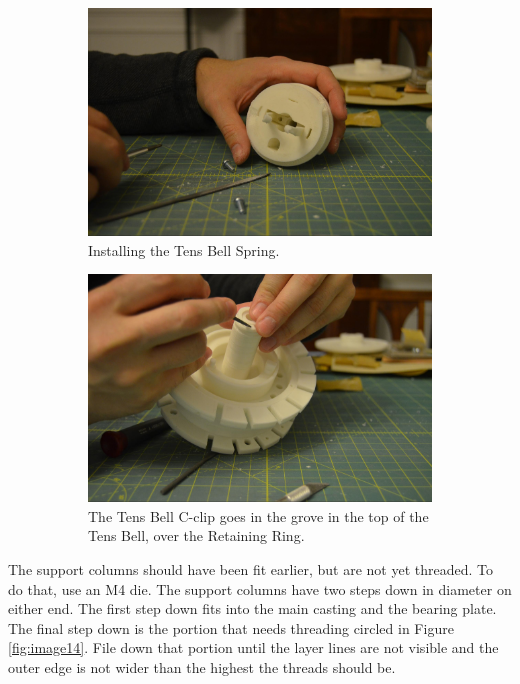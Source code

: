 \documentclass[openany]{book}
\begin{document}
\begin{figure}[!ht]
	\centering
	\begin{subfigure}{.4\textwidth}
		\centering
		\includegraphics[width=.95\textwidth]{images/image4.jpg}
		\caption{Installing the Tens Bell Spring.}
		\label{fig:image4}	
	\end{subfigure}
	\begin{subfigure}{.4\textwidth}
		\centering
		\includegraphics[width=.95\textwidth]{images/image47.jpg}
		\caption{The Tens Bell C-clip goes in the grove in the top of the Tens Bell, over the Retaining Ring.}
		\label{fig:image47}	
	\end{subfigure}
	\caption{}
\end{figure}

The support columns should have been fit earlier, but are not yet threaded. To do that, use an M4 die. The support columns have two steps down in diameter on either end. The first step down fits into the main casting and the bearing plate. The final step down is the portion that needs threading circled in Figure \ref{fig:image14}. File down that portion until the layer lines are not visible and the outer edge is not wider than the highest the threads should be.
\end{document}
